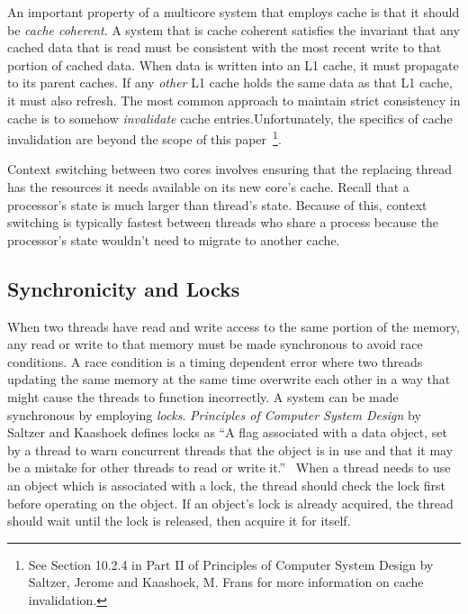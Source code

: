 \documentclass{sig-alternate}
\begin{document}


An important property of a multicore system that employs cache is that it should be \emph{cache coherent}. A system that is cache coherent satisfies the invariant that any cached data that is read must be consistent with the most recent write to that portion of cached data. When data is written into an L1 cache, it must propagate to its parent caches. If any \emph{other} L1 cache holds the same data as that L1 cache, it must also refresh. The most common approach to maintain strict consistency in cache is to somehow \emph{invalidate} cache entries.Unfortunately, the specifics of cache invalidation are beyond the scope of this paper~\footnote{See Section 10.2.4 in Part II of Principles of Computer System Design by Saltzer, Jerome and Kaashoek, M. Frans for more information on cache invalidation.}.~\cite{Systems}

Context switching between two cores involves ensuring that the replacing thread has the resources it needs available on its new core's cache. Recall that a processor's state is much larger than thread's state. Because of this, context switching is typically fastest between threads who share a process because the processor's state wouldn't need to migrate to another cache.

\subsection{Synchronicity and Locks}
\label{sec:locks}

When two threads have read and write access to the same portion of the memory, any read or write to that memory must be made synchronous to avoid race conditions. A race condition is a timing dependent error where two threads updating the same memory at the same time overwrite each other in a way that might cause the threads to function incorrectly. A system can be made synchronous by employing \emph{locks}. \textit{Principles of Computer System Design} by Saltzer and Kaashoek defines locks as ``A flag associated with a data object, set by a thread to warn concurrent threads that the object is in use and that it may be a mistake for other threads to read or write it.''~\cite{Systems}
When a thread needs to use an object which is associated with a lock, the thread should check the lock first before operating on the object. If an object's lock is already acquired, the thread should wait until the lock is released, then acquire it for itself.
\end{document}
